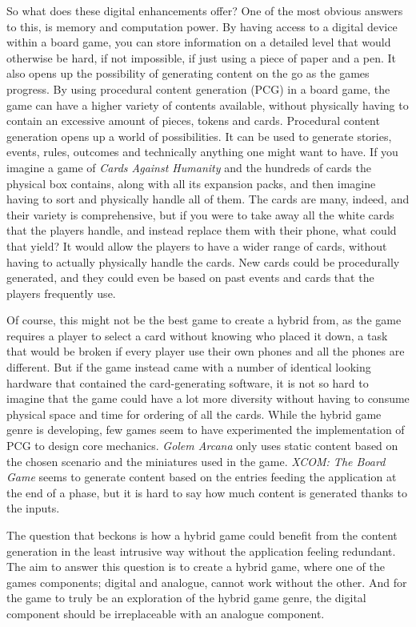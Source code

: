 So what does these digital enhancements offer? One of the most obvious answers to this, is memory and computation power. By having access to a digital device within a board game, you can store information on a detailed level that would otherwise be hard, if not impossible, if just using a piece of paper and a pen. 
It also opens up the possibility of generating content on the go as the games progress. By using procedural content generation (PCG) in a board game, the game can have a higher variety of contents available, without physically having to contain an excessive amount of pieces, tokens and cards. 
Procedural content generation opens up a world of possibilities. It can be used to generate stories, events, rules, outcomes and technically anything one might want to have. If you imagine a game of \textit{Cards Against Humanity}\cite{game:cah} and the hundreds of cards the physical box contains, along with all its expansion packs, and then imagine having to sort and physically handle all of them. The cards are many, indeed, and their variety is comprehensive, but if you were to take away all the white cards that the players handle, and instead replace them with their phone, what could that yield? It would allow the players to have a wider range of cards, without having to actually physically handle the cards. New cards could be procedurally generated, and they could even be based on past events and cards that the players frequently use. 

Of course, this might not be the best game to create a hybrid from, as the game requires a player to select a card without knowing who placed it down, a task that would be broken if every player use their own phones and all the phones are different. But if the game instead came with a number of identical looking hardware that contained the card-generating software, it is not so hard to imagine that the game could have a lot more diversity without having to consume physical space and time for ordering of all the cards.
While the hybrid game genre is developing, few games seem to have experimented the implementation of PCG to design core mechanics. 
\textit{Golem Arcana} only uses static content based on the chosen scenario and the miniatures used in the game.
\textit{XCOM: The Board Game} seems to generate content based on the entries feeding the application at the end of a phase, but it is hard to say how much content is generated thanks to the inputs. 

The question that beckons is how a hybrid game could benefit from the content generation in the least intrusive way without the application feeling redundant. The aim to answer this question is to create a hybrid game, where one of the games components; digital and analogue, cannot work without the other. And for the game to truly be an exploration of the hybrid game genre, the digital component should be irreplaceable with an analogue component. 

